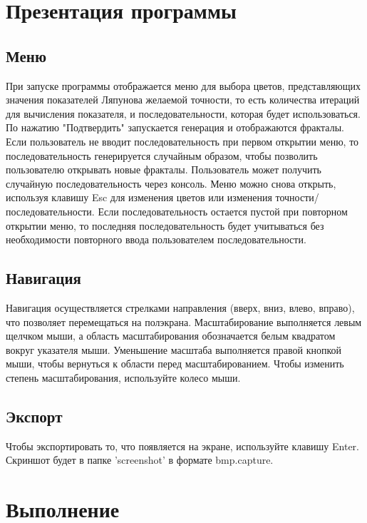 \documentclass[a5paper,10pt, twoside]{article} %
\begin{document}
\section{Презентация программы}
  
  \subsection{Меню}

  При запуске программы отображается меню для выбора цветов, представляющих значения показателей Ляпунова
  желаемой точности, то есть количества итераций для вычисления показателя, и последовательности, которая будет использоваться.
  По нажатию "Подтвердить" запускается генерация и отображаются фракталы.
  Если пользователь не вводит последовательность при первом открытии меню, то последовательность генерируется случайным образом, 
  чтобы позволить пользователю открывать новые фракталы.
  Пользователь может получить случайную последовательность через консоль.
  Меню можно снова открыть, используя клавишу Esc для изменения цветов или изменения точности/последовательности.
  Если последовательность остается пустой при повторном открытии меню, то последняя последовательность будет учитываться 
  без необходимости повторного ввода пользователем последовательности.

  \subsection{Навигация}

  Навигация осуществляется стрелками направления (вверх, вниз, влево, вправо), что позволяет перемещаться на полэкрана.
  Масштабирование выполняется левым щелчком мыши, а область масштабирования обозначается белым квадратом вокруг указателя мыши.
  Уменьшение масштаба выполняется правой кнопкой мыши, чтобы вернуться к области перед масштабированием.
  Чтобы изменить степень масштабирования, используйте колесо мыши.

  \subsection{Экспорт}

  Чтобы экспортировать то, что появляется на экране, используйте клавишу Enter.
  Скриншот будет в папке 'screenshot' в формате bmp.capture.

\section{Выполнение}
  
\end{document}
